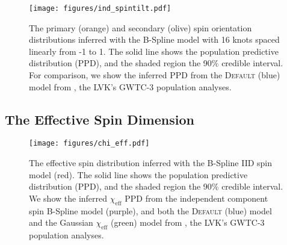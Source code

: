 \begin{figure}[ht]
    \begin{centering}
        \texttt{[image: figures/ind\_spintilt.pdf]}
        \caption{The primary (orange) and secondary (olive) spin orientation distributions inferred with the B-Spline model with 16 knots spaced linearly from -1 to 1. The solid line shows the population predictive distribution (PPD), and the shaded region the 90\% credible interval. 
        For comparison, we show the inferred PPD from the \textsc{Default} (blue) model from \citet{o3b_astro_dist}, the LVK's GWTC-3 population analyses.}
        \label{fig:ind_spintilt_dist}
    \end{centering}
\end{figure}

\subsection{The Effective Spin Dimension}

\begin{figure}[ht]
    \begin{centering}
        \texttt{[image: figures/chi\_eff.pdf]}
        \caption{The effective spin distribution inferred with the B-Spline IID spin model (red). The solid line shows the population predictive distribution (PPD), and the shaded region the 90\% credible interval. We show the inferred $\chi_\mathrm{eff}$ 
        PPD from the independent component spin B-Spline model (purple), and both the \textsc{Default} (blue) model and the 
        Gaussian $\chi_\mathrm{eff}$ (green) model from \citet{o3b_astro_dist}, the LVK's GWTC-3 population analyses.}
        \label{fig:chieff_dist}
    \end{centering}
\end{figure}

